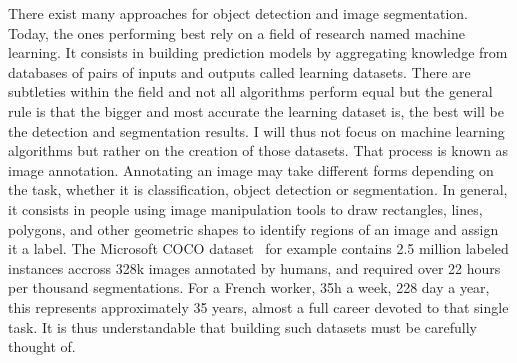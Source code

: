 There exist many approaches for object detection and image segmentation.
Today, the ones performing best rely on a field of research named machine learning.
It consists in building prediction models by aggregating knowledge
from databases of pairs of inputs and outputs called learning datasets.
There are subtleties within the field
and not all algorithms perform equal but the general rule is that
the bigger and most accurate the learning dataset is,
the best will be the detection and segmentation results.
I will thus not focus on machine learning algorithms
but rather on the creation of those datasets.
That process is known as image annotation.
Annotating an image may take different forms depending on the task,
whether it is classification, object detection or segmentation.
In general, it consists in people using image manipulation tools
to draw rectangles, lines, polygons, and other geometric shapes
to identify regions of an image and assign it a label.
The Microsoft COCO dataset~\cite{lin2014microsoft} for example
contains 2.5 million labeled instances accross 328k images annotated by humans,
and required over 22 hours per thousand segmentations.
For a French worker, 35h a week, 228 day a year, this represents approximately 35 years,
almost a full career devoted to that single task.
It is thus understandable that building such datasets must be carefully thought of.

